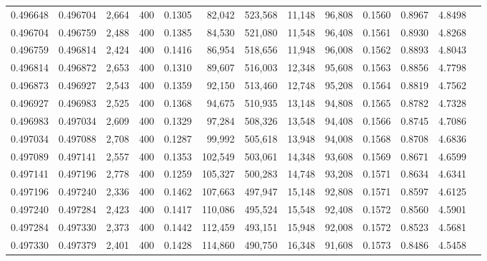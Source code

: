 \begin{tabular}{rrrrrrrrrrrrr}
0.496648 & 0.496704 & 2,664 & 400 &                                     0.1305 &  82,042 & 523,568 &  11,148 &  96,808 & 0.1560 & 0.8967 & 4.8498 \\
0.496704 & 0.496759 & 2,488 & 400 &                                     0.1385 &  84,530 & 521,080 &  11,548 &  96,408 & 0.1561 & 0.8930 & 4.8268 \\
0.496759 & 0.496814 & 2,424 & 400 &                                     0.1416 &  86,954 & 518,656 &  11,948 &  96,008 & 0.1562 & 0.8893 & 4.8043 \\
0.496814 & 0.496872 & 2,653 & 400 &                                     0.1310 &  89,607 & 516,003 &  12,348 &  95,608 & 0.1563 & 0.8856 & 4.7798 \\
0.496873 & 0.496927 & 2,543 & 400 &                                     0.1359 &  92,150 & 513,460 &  12,748 &  95,208 & 0.1564 & 0.8819 & 4.7562 \\
0.496927 & 0.496983 & 2,525 & 400 &                                     0.1368 &  94,675 & 510,935 &  13,148 &  94,808 & 0.1565 & 0.8782 & 4.7328 \\
0.496983 & 0.497034 & 2,609 & 400 &                                     0.1329 &  97,284 & 508,326 &  13,548 &  94,408 & 0.1566 & 0.8745 & 4.7086 \\
0.497034 & 0.497088 & 2,708 & 400 &                                     0.1287 &  99,992 & 505,618 &  13,948 &  94,008 & 0.1568 & 0.8708 & 4.6836 \\
0.497089 & 0.497141 & 2,557 & 400 &                                     0.1353 & 102,549 & 503,061 &  14,348 &  93,608 & 0.1569 & 0.8671 & 4.6599 \\
0.497141 & 0.497196 & 2,778 & 400 &                                     0.1259 & 105,327 & 500,283 &  14,748 &  93,208 & 0.1571 & 0.8634 & 4.6341 \\
0.497196 & 0.497240 & 2,336 & 400 &                                     0.1462 & 107,663 & 497,947 &  15,148 &  92,808 & 0.1571 & 0.8597 & 4.6125 \\
0.497240 & 0.497284 & 2,423 & 400 &                                     0.1417 & 110,086 & 495,524 &  15,548 &  92,408 & 0.1572 & 0.8560 & 4.5901 \\
0.497284 & 0.497330 & 2,373 & 400 &                                     0.1442 & 112,459 & 493,151 &  15,948 &  92,008 & 0.1572 & 0.8523 & 4.5681 \\
0.497330 & 0.497379 & 2,401 & 400 &                                     0.1428 & 114,860 & 490,750 &  16,348 &  91,608 & 0.1573 & 0.8486 & 4.5458 \\

\end{tabular}
